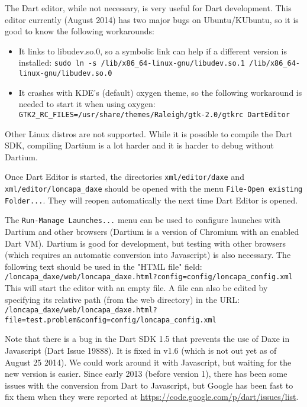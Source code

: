 The Dart editor, while not necessary, is very useful for Dart development. This editor currently (August 2014) has two major bugs on Ubuntu/KUbuntu, so it is good to know the following workarounds:
\begin{itemize}
\item It links to libudev.so.0, so a symbolic link can help if a different version is installed:
  \texttt{sudo ln -s /lib/x86\_64-linux-gnu/libudev.so.1 /lib/x86\_64-linux-gnu/libudev.so.0}
\item It crashes with KDE's (default) oxygen theme, so the following workaround is needed to start it when using oxygen:
  \texttt{GTK2\_RC\_FILES=/usr/share/themes/Raleigh/gtk-2.0/gtkrc DartEditor}
\end{itemize}

Other Linux distros are not supported. While it is possible to compile the Dart SDK, compiling Dartium is a lot harder and it is harder to debug without Dartium.

Once Dart Editor is started, the directories \texttt{xml/editor/daxe} and \texttt{xml/editor/loncapa\_daxe} should be opened with the menu \texttt{File-Open existing Folder...}. They will reopen automatically the next time Dart Editor is opened.

The \texttt{Run-Manage Launches...} menu can be used to configure launches with Dartium and other browsers (Dartium is a version of Chromium with an enabled Dart VM). Dartium is good for development, but testing with other browsers (which requires an automatic conversion into Javascript) is also necessary.
The following text should be used in the "HTML file" field:
\texttt{/loncapa\_daxe/web/loncapa\_daxe.html?config=config/loncapa\_config.xml}
This will start the editor with an empty file. A file can also be edited by specifying its relative path (from the web directory) in the URL:
\texttt{/loncapa\_daxe/web/loncapa\_daxe.html?file=test.problem\&config=config/loncapa\_config.xml}

Note that there is a bug in the Dart SDK 1.5 that prevents the use of Daxe in Javascript (Dart Issue 19888). It is fixed in v1.6 (which is not out yet as of August 25 2014). We could work around it with Javascript, but waiting for the new version is easier. Since early 2013 (before version 1), there has been some issues with the conversion from Dart to Javascript, but Google has been fast to fix them when they were reported at \url{https://code.google.com/p/dart/issues/list}.

